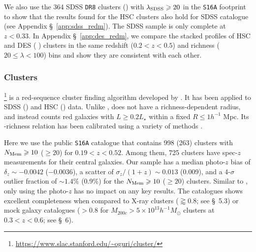 \documentclass[fleqn,usenatbib,useAMS]{mnras}
\begin{document}
    We also use the 364 SDSS \texttt{DR8} \redm{} clusters (\citealt{Rykoff2014}) with $\lambda_{\rm
    SDSS} \geq 20$ in the \texttt{S16A} footprint to show that the results found for the HSC \redm{}
    clusters also hold for SDSS \redm{} catalogue (see Appendix \S\ \ref{app:sdss_redm}).
    The SDSS sample is only complete at $z < 0.33$.
    In Appendix \S\ \ref{app:des_redm}, we compare the stacked \dsigma{} profiles of HSC and DES
    \redm{} (\eg{} \citealt{Chang2018, McClintock2019}) clusters in the same redshift ($0.2 < z <
    0.5$) and richness ($20 \leq \lambda < 100$) bins and show they are consistent with each other.

\subsubsection{\camira{} Clusters}
    \label{sec:cluster_camira}

    \camira{}\footnote{\url{https://www.slac.stanford.edu/~oguri/cluster/}} is a
    red-sequence cluster finding algorithm developed by \citet{Oguri2014}.
    It has been applied to SDSS (\citealt{Oguri2014}) and HSC (\citealt{Oguri2018}) data.
    Unlike \redm{}, \camira{} does not have a richness-dependent radius, and instead counts red
    galaxies with $L \geq 0.2L_{\star}$ within a fixed $R\leq 1 h^{-1}$ Mpc.
    Its \mvir{}-richness relation has been calibrated using a variety of methods \citep{Murata2019,
    Chiu2020a, Chiu2020b}.

    Here we use the public \texttt{S16A} \camira{} catalogue that contains 998 (263) clusters with
    $N_{\rm Mem} \geq 10$ ($\geq 20$) for $0.19 < z < 0.52$.
    Among them, 725 clusters have spec-$z$ measurements for their central galaxies.
    Our \camira{} sample has a median photo-$z$ bias of $\delta_{z} \sim -0.0042$ ($-0.0036$), a
    scatter of $\sigma_{z}/(1 + z) \sim 0.013$ (0.009), and a 4-$\sigma$ outlier fraction of
    $\sim 1.4$\% (0.9\%) for the $N_{\rm Mem} \geq 10$ ($\geq 20$) clusters.
    Similar to \redm{}, only using the photo-$z$ has no impact on any key results.
    The \camira{} catalogues shows excellent completeness when compared to X-ray clusters
    ($\gtrapprox 0.8$; see \citealt{Oguri2018} \S\ 5.3) or mock galaxy catalogues ($> 0.8$ for
    $M_{200c} > 5 \times 10^{13} h^{-1} M_{\odot}$ clusters at $0.3 < z < 0.6$; see
    \citealt{Oguri2018} \S\ 6).
\end{document}
